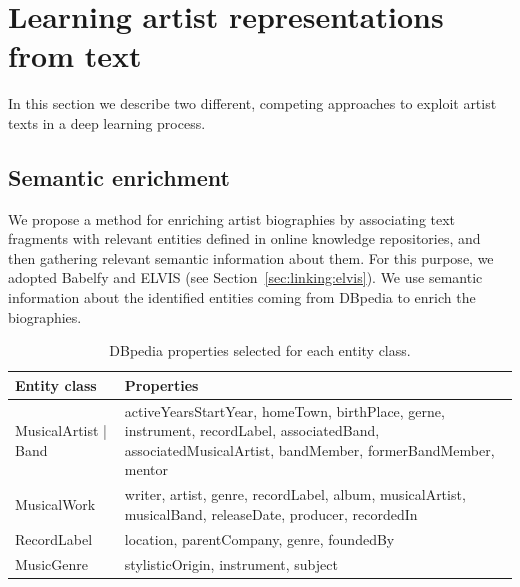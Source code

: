 \section{Learning artist representations from text}\label{sec:cold-rec:text}

In this section we describe two different, competing approaches to exploit artist texts in a deep learning process. %

\subsection{Semantic enrichment}\label{sec:cold-rec:sem}

We propose a method for enriching artist biographies by associating text fragments with relevant entities defined in online knowledge repositories, and then gathering relevant semantic information about them. For this purpose, we adopted Babelfy \citep{Moroetal2014} and ELVIS (see Section~\ref{sec:linking:elvis}). We use semantic information about the identified entities coming from DBpedia to enrich the biographies. 


\begin{table}
\centering
\begin{tabular}{l p{8cm}}
\toprule
\textbf{Entity class} & \textbf{Properties} \\
\midrule
MusicalArtist | Band & activeYearsStartYear, homeTown, birthPlace, gerne, instrument, recordLabel, associatedBand, associatedMusicalArtist, bandMember, formerBandMember, mentor \\
MusicalWork & writer, artist, genre, recordLabel, album, musicalArtist, musicalBand, releaseDate, producer, recordedIn \\
RecordLabel & location, parentCompany, genre, foundedBy \\
MusicGenre & stylisticOrigin, instrument, subject \\
\bottomrule
\end{tabular}
\caption{DBpedia properties selected for each entity class.}
\label{tbl:cold-rec:properties}
\end{table}

